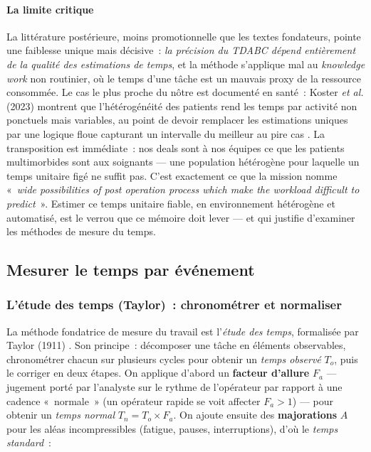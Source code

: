 \paragraph{La limite critique}
La littérature postérieure, moins promotionnelle que les textes fondateurs, pointe une
faiblesse unique mais décisive~: \emph{la précision du TDABC dépend entièrement de la
qualité des estimations de temps}, et la méthode s'applique mal au \textit{knowledge
work} non routinier, où le temps d'une tâche est un mauvais proxy de la ressource
consommée. Le cas le plus proche du nôtre est documenté en santé~: Koster \textit{et al.}
(2023) montrent que l'hétérogénéité des patients rend les temps par activité non
ponctuels mais variables, au point de devoir remplacer les estimations uniques par une
logique floue capturant un intervalle du meilleur au pire cas \cite{koster2023}. La
transposition est immédiate~: nos deals sont à nos équipes ce que les patients
multimorbides sont aux soignants --- une population hétérogène pour laquelle un temps
unitaire figé ne suffit pas. C'est exactement ce que la mission nomme «~\textit{wide
possibilities of post operation process which make the workload difficult to
predict}~». Estimer ce temps unitaire fiable, en environnement hétérogène et automatisé,
est le verrou que ce mémoire doit lever --- et qui justifie d'examiner les méthodes de
mesure du temps.

\subsection{Mesurer le temps par événement}
\label{sec:mesure-temps}

\subsubsection{L'étude des temps (Taylor)~: chronométrer et normaliser}

La méthode fondatrice de mesure du travail est l'\textit{étude des temps}, formalisée par
Taylor (1911) \cite{taylor1911, groover2007}. Son principe~: décomposer une tâche en
éléments observables, chronométrer chacun sur plusieurs cycles pour obtenir un
\emph{temps observé} $T_o$, puis le corriger en deux étapes. On applique d'abord un
\textbf{facteur d'allure} $F_a$ --- jugement porté par l'analyste sur le rythme de
l'opérateur par rapport à une cadence «~normale~» (un opérateur rapide se voit affecter
$F_a > 1$) --- pour obtenir un \emph{temps normal} $T_n = T_o \times F_a$. On ajoute
ensuite des \textbf{majorations} $A$ pour les aléas incompressibles (fatigue, pauses,
interruptions), d'où le \emph{temps standard}~:

